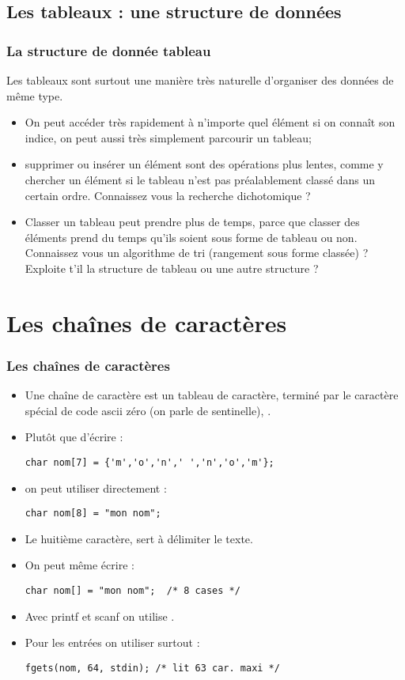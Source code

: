 \documentclass[xcolor=pdftex,svgnames,table]{beamer}
\begin{document}
\subsection{Les tableaux : une structure de données}
\begin{frame}
  \frametitle{La structure de donnée tableau}
    Les tableaux sont surtout une manière très naturelle d'organiser
    des données de même type. 
\pause
  \begin{itemize}
\item On peut accéder très rapidement à
  n'importe quel élément si on connaît son indice, 
on peut aussi  très simplement parcourir un tableau;
 \item supprimer ou insérer un élément sont des opérations
    plus lentes, comme y chercher un élément si le tableau n'est pas préalablement
    classé dans un certain ordre. \pause \alert{Connaissez vous la recherche
    dichotomique ?}\pause
\item Classer un tableau peut prendre plus de temps, parce que 
  classer des éléments prend du temps qu'ils
    soient sous forme de tableau ou non. \pause \alert{Connaissez vous un
    algorithme de tri (rangement sous forme classée) ?} Exploite t'il
    la structure de tableau ou une autre structure ?
  \end{itemize}
\end{frame}

\section{Les chaînes de caractères}
\begin{frame}[fragile]
  \frametitle{Les chaînes de caractères}
  \begin{itemize}
    \item Une chaîne de caractère est un tableau de caractère, terminé
      par le caractère spécial de code ascii zéro (on parle de
      sentinelle), \alert{}.
\item Plutôt que d'écrire : 
  \begin{lstlisting}
char nom[7] = {'m','o','n',' ','n','o','m'};
  \end{lstlisting}
\item on peut utiliser directement :
  \begin{lstlisting}
char nom[8] = "mon nom";
  \end{lstlisting}
\item Le huitième caractère,  sert à délimiter le
  texte. 
\item On peut même écrire :
  \begin{lstlisting}
char nom[] = "mon nom";  /* 8 cases */
  \end{lstlisting}
\item Avec printf et scanf  on utilise .
\item Pour les entrées on utiliser surtout   :
  \begin{lstlisting}
fgets(nom, 64, stdin); /* lit 63 car. maxi */
  \end{lstlisting}
  \end{itemize}
\end{frame}
\end{document}
